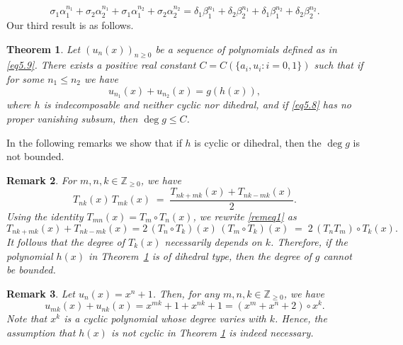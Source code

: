 \documentclass[12pt]{amsart}
\newtheorem{theorem}{Theorem}[section]
\newtheorem{remark}[theorem]{Remark}
\begin{document}
\begin{equation}\label{eq5.8}
\sigma_1\alpha_1^{n_1}+\sigma_2\alpha_2^{n_1}+\sigma_1\alpha_1^{n_2}+\sigma_2\alpha_2^{n_2}=\delta_1\beta_1^{n_1}+\delta_2\beta_2^{n_1}+\delta_1\beta_1^{n_2}+\delta_2\beta_2^{n_2}.
	\end{equation}
Our third result is as follows.
\begin{theorem}\label{thm2}
	 Let $(u_n(x))_{n\geq 0}$ be a sequence of polynomials defined as in \eqref{eq5.9}. There exists a positive real constant $C=C(\{a_i, u_i: i=0,1\})$ such that if for some $n_1\leq  n_2$ we have 
     \[u_{n_1}(x)+u_{n_2}(x)=g(h(x)),\]
     where $h$ is indecomposable and neither cyclic nor dihedral, and if \eqref{eq5.8} has no proper vanishing subsum, then $\deg g \leq C$.
	\end{theorem}
In the following remarks we show that if $h$ is cyclic or dihedral, then the $\deg g$ is not bounded.
    \begin{remark}
        For $m,n,k \in \mathbb{Z}_{\geq 0}$, we have 
        \begin{equation}\label{remeq1}
            T_{nk}(x)\,T_{mk}(x) \;=\; \frac{T_{nk+mk}(x)+T_{nk-mk}(x)}{2}.
        \end{equation}
Using the identity $T_{mn}(x)=T_m \circ T_n(x)$, we rewrite \eqref{remeq1} as  
\[
T_{nk+mk}(x)+T_{nk-mk}(x)=2\,(T_n \circ T_k)(x)\,(T_m \circ T_k)(x) 
\;=\; 2\,(T_n T_m)\circ T_k(x)  .
\]
It follows that the degree of $T_k(x)$ necessarily depends on $k$. Therefore, if the polynomial $h(x)$ in Theorem~\ref{thm2} is of dihedral type, then the degree of $g$ cannot be bounded.
    \end{remark}

    \begin{remark}
        Let $u_n(x)=x^n+1$. Then, for any $m,n,k \in \mathbb{Z}_{\geq 0}$, we have  
\[
u_{mk}(x)+u_{nk}(x) = x^{mk}+1+x^{nk}+1 = (x^m+x^n+2)\circ x^k.
\]  
Note that $x^k$ is a cyclic polynomial whose degree varies with $k$. Hence, the assumption that $h(x)$ is not cyclic in Theorem \ref{thm2} is indeed necessary.
    \end{remark}
\end{document}
